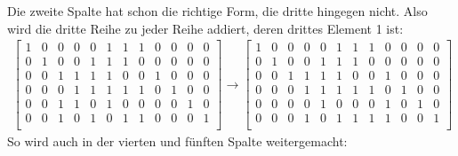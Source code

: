 \documentclass[a4paper,10pt,ngerman]{scrartcl}
\begin{document}
Die zweite Spalte hat schon die richtige Form, die dritte hingegen nicht. Also wird die dritte Reihe zu jeder Reihe addiert, deren drittes Element 1 ist:
\begin{align*}
\left[ \begin{array}{cccccc|cccccc}
1 & 0 & 0 & 0 & 0 & 1 & 1 & 1 & 0 & 0 & 0 & 0 \\
0 & 1 & 0 & 0 & 1 & 1 & 1 & 0 & 0 & 0 & 0 & 0 \\
0 & 0 & 1 & 1 & 1 & 1 & 0 & 0 & 1 & 0 & 0 & 0 \\
0 & 0 & 0 & 1 & 1 & 1 & 1 & 1 & 0 & 1 & 0 & 0 \\
0 & 0 & 1 & 1 & 0 & 1 & 0 & 0 & 0 & 0 & 1 & 0 \\
0 & 0 & 1 & 0 & 1 & 0 & 1 & 1 & 0 & 0 & 0 & 1 \\
\end{array} \right]
\rightarrow \left[ \begin{array}{cccccc|cccccc}
1 & 0 & 0 & 0 & 0 & 1 & 1 & 1 & 0 & 0 & 0 & 0 \\
0 & 1 & 0 & 0 & 1 & 1 & 1 & 0 & 0 & 0 & 0 & 0 \\
0 & 0 & 1 & 1 & 1 & 1 & 0 & 0 & 1 & 0 & 0 & 0 \\
0 & 0 & 0 & 1 & 1 & 1 & 1 & 1 & 0 & 1 & 0 & 0 \\
0 & 0 & 0 & 0 & 1 & 0 & 0 & 0 & 1 & 0 & 1 & 0 \\
0 & 0 & 0 & 1 & 0 & 1 & 1 & 1 & 1 & 0 & 0 & 1 \\
\end{array} \right]
\end{align*}
So wird auch in der vierten und fünften Spalte weitergemacht:
\end{document}
